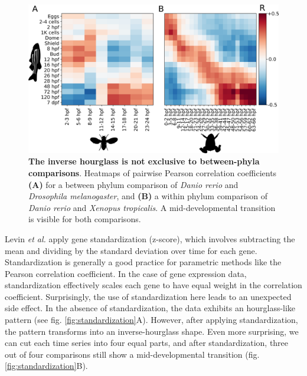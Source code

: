 \begin{figure}[H]
    \includegraphics[width=\linewidth]{ch.hourglass/images/within_between_phyla.png}
    \caption{\textbf{The inverse hourglass is not exclusive to between-phyla comparisons}. Heatmaps of pairwise Pearson correlation coefficients \textbf{(A)} for a between phylum comparison of \textit{Danio rerio} and \textit{Drosophila melanogaster}, and \textbf{(B)} a within phylum comparison of \textit{Danio rerio} and \textit{Xenopus tropicalis}. A mid-developmental transition is visible for both comparisons.}
    \label{fig:within_phylum}
\end{figure}

Levin \textit{et al.} apply gene standardization (z-score), which involves subtracting the mean and dividing by the standard deviation over time for each gene. Standardization is generally a good practice for parametric methods like the Pearson correlation coefficient. In the case of gene expression data, standardization effectively scales each gene to have equal weight in the correlation coefficient. Surprisingly, the use of standardization here leads to an unexpected side effect. In the absence of standardization, the data exhibits an hourglass-like pattern (see fig. \ref{fig:standardization}A). However, after applying standardization, the pattern transforms into an inverse-hourglass shape. Even more surprising, we can cut each time series into four equal parts, and after standardization, three out of four comparisons still show a mid-developmental transition (fig. \ref{fig:standardization}B). 

